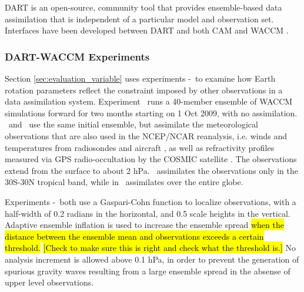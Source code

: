 DART \citep{Anderson2009} is an open-source, community tool that provides ensemble-based data assimilation that is independent of a particular model and observation set.
Interfaces have been developed between DART and both CAM \citep{Raeder2012} and WACCM \citep{Pedatella2013}.

\subsubsection{DART-WACCM Experiments}
Section \ref{sec:evaluation_variable} uses experiments \WACCMNODA-\WACCMGLOBAL~to examine how Earth rotation parameters reflect the constraint imposed by other observations in a data assimilation system.  
Experiment \WACCMNODA~runs a 40-member ensemble of WACCM simulations forward for two months starting on 1 Oct 2009, with no assimilation. 
\WACCMTROPICS~and \WACCMGLOBAL~use the same initial ensemble, but assimilate the meteorological observations that are also used in the NCEP/NCAR reanalysis, i.e. winds and temperatures from radiosondes and aircraft \citep{Saha2010}, as well as refractivity profiles measured via GPS radio-occultation by the COSMIC satellite \citep{Anthes2008}.
The observations extend from the surface to about 2 hPa. 
\WACCMTROPICS~assimilates the observations only in the 30S-30N tropical band, while in \WACCMGLOBAL~assimilates over the entire globe.

Experiments \WACCMTROPICS-\WACCMGLOBAL~both use a Gaspari-Cohn function \citep{Gaspari1999} to localize observations, with a half-width of 0.2 radians in the horizontal, and 0.5 scale heights in the vertical.  
Adaptive ensemble inflation \citep{Anderson2009} is used to increase the ensemble spread \hl{when the distance between the ensemble mean and observations exceeds a certain threshold.}
\hl{[Check to make sure this is right and check what the threshold is.]}
No analysis increment is allowed above 0.1 hPa, in order to prevent the generation of spurious gravity waves resulting from a large ensemble spread in the absense of upper level observations. 


